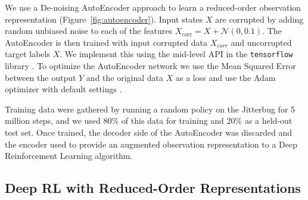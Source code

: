 \documentclass[letterpaper, 10 pt, conference]{ieeeconf}
\begin{document}
We use a De-noising AutoEncoder approach to learn a reduced-order observation representation (Figure~\ref{fig:autoencoder}).
Input states $X$ are corrupted by adding random unbiased noise to each of the features $X_\text{corr} = X + \mathcal{N}(0, 0.1)$.
The AutoEncoder is then trained with input corrupted data $X_{corr}$ and uncorrupted target labels $X$.
We implement this using the mid-level API in the \texttt{tensorflow} library \cite{Abadi2015Tensorflow}.
To optimize the AutoEncoder network we use the Mean Squared Error between the output $Y$ and the original data $X$ as a loss and use the Adam optimizer with default settings \cite{Adam}.

Training data were gathered by running a random policy on the Jitterbug for 5 million steps, and we used 80\% of this data for training and 20\% as a held-out test set.
Once trained, the decoder side of the AutoEncoder was discarded and the encoder used to provide an augmented observation representation to a Deep Reinforcement Learning algorithm.

\subsection{Deep RL with Reduced-Order Representations}
\end{document}
